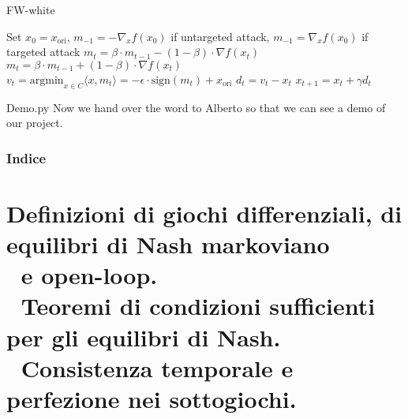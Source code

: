 \documentclass{beamer}
\theoremstyle{plain}
\theoremstyle{definition}
\begin{document}
\begin{frame}{FW-white}
    
    \begin{algorithm}[H]
\caption{FW-White}\label{FW}
\begin{algorithmic}[1]

\State Set $x_0 = x_{\text{ori}}$, $m_{-1} = - \nabla_x f(x_0)$ if untargeted attack, $m_{-1} = \nabla_x f(x_0)$ if targeted attack
    \State $m_t = \beta \cdot m_{t-1} - (1-\beta) \cdot \nabla f(x_t) $ 
    \State $m_t = \beta \cdot m_{t-1} + (1-\beta) \cdot \nabla f(x_t) $ 
    \State $v_t = \text{argmin}_{x \in C} \langle x, m_t \rangle = - \epsilon \cdot \text{sign} (m_t) + x_{\text{ori}} $
    \State $d_t = v_t - x_t $
    \State $x_{t+1} = x_t + \gamma d_t $
    
\EndFor
\end{algorithmic}
\end{algorithm}
\end{frame}


\begin{frame}{Demo.py}
    Now we hand over the word to Alberto so that we can see a demo of our project. 
\end{frame}




\begin{frame}
\frametitle{Indice}
\tableofcontents
\end{frame}

\section{Definizioni di giochi differenziali, di equilibri di Nash markoviano \\
\,\,\,\,e open-loop.  \\ 
\,\,\,\,Teoremi di condizioni sufficienti per gli equilibri di Nash. \\ 
\,\,\,\,Consistenza temporale e perfezione nei sottogiochi.}
\end{document}
